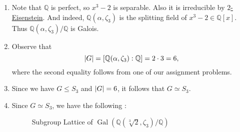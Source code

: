\documentclass[notoc,notitlepage,nobib]{tufte-book}
\DeclareMathOperator{\Gal}{Gal}
\begin{document}
\begin{solution}
  \begin{enumerate}
    \item Note that $\mathbb{Q}$ is perfect, so $x^3 - 2$ is separable. Also it
      is irreducible by
      \hyperref[propo:eisenstein_s_criterion]{$2$-Eisenstein}. And indeed,
      $\mathbb{Q}(\alpha, \zeta_3)$ is the splitting field of $x^3 - 2 \in
      \mathbb{Q}[x]$. Thus $\mathbb{Q}(\alpha, \zeta_3) / \mathbb{Q}$ is Galois.

    \item Observe that
      \begin{equation*}
        \left|G\right| = [ \mathbb{Q}(\alpha, \zeta_3) : \mathbb{Q} ] = 2 \cdot 3 = 6,
      \end{equation*}
      where the second equality follows from one of our assignment problems.

    \item Since we have $G \leq S_3$ and $\left|G\right| = 6$, it follows that $G
      \simeq S_3$.

    \item Since $G \simeq S_3$, we have the following :
      \begin{figure*}[ht]
        \centering
        \caption{Subgroup Lattice of $\Gal(\mathbb{Q}(\sqrt[3]{2}, \zeta_3) /
        \mathbb{Q})$}
        \label{fig:subgroup_lattice_of_gal_q_sqrt_3_2_zeta_3_q_}
      \end{figure*}


\end{enumerate}
\end{solution}
\end{document}
